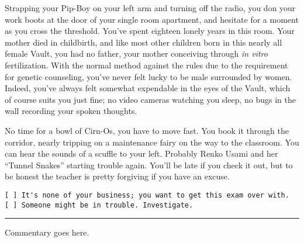 \documentclass[a4paper,12pt]{book}
\newenvironment{commentary}%
	{
		\vfill%
		\hrule%
		\begin{footnotesize}%
		\color{MidnightBlue}%
	}%
	{%
		\end{footnotesize}%
	}
\begin{document}
Strapping your Pip-Boy on your left arm and turning off the radio, you don your work boots at the door of your single room apartment, and hesitate for a moment as you cross the threshold. You've spent eighteen lonely years in this room. Your mother died in childbirth, and like most other children born in this nearly all female Vault, you had no father, your mother conceiving through \emph{in vitro} fertilization. With the normal method against the rules due to the requirement for genetic counseling, you've never felt lucky to be male surrounded by women. Indeed, you've always felt somewhat expendable in the eyes of the Vault, which of course suits you just fine; no video cameras watching you sleep, no bugs in the wall recording your spoken thoughts.

No time for a bowl of Cirn-Os, you have to move fast. You book it through the corridor, nearly tripping on a maintenance fairy on the way to the classroom. You can hear the sounds of a scuffle to your left. Probably Renko Usami and her ``Tunnel Snakes'' starting trouble again. You'll be late if you check it out, but to be honest the teacher is pretty forgiving if you have an excuse.

\begin{verbatim}
[ ] It's none of your business; you want to get this exam over with.
[ ] Someone might be in trouble. Investigate.
\end{verbatim}


\begin{commentary}
Commentary goes here.
\end{commentary}
\end{document}
